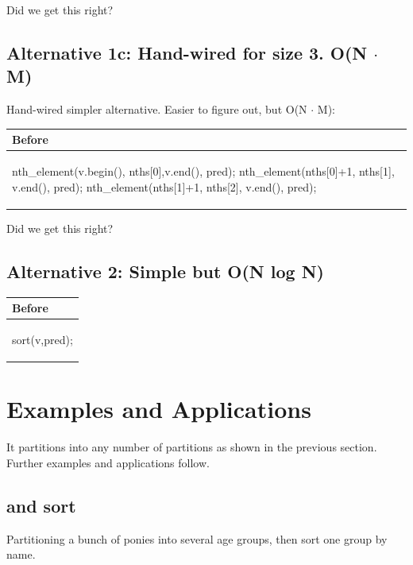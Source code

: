 Did we get this right?

\subsection*{Alternative 1c: Hand-wired for size 3. O(N $\cdot$ M)}

Hand-wired simpler alternative. Easier to figure out, but O(N $\cdot$ M):

\hspace{3ex}\begin{tabular}{|l|} 
  \hline 
  \textbf{Before} \\
  \hline 
\begin{codeblock} 
nth_element(v.begin(), nths[0],v.end(), pred);
nth_element(nths[0]+1, nths[1], v.end(), pred);
nth_element(nths[1]+1, nths[2], v.end(), pred);
\end{codeblock} 
\\
\hline 
\end{tabular} 

Did we get this right?

\subsection*{Alternative 2: Simple but O(N log N)}

\hspace{3ex}\begin{tabular}{|l|} 
  \hline 
  \textbf{Before} \\
  \hline 
\begin{codeblock} 
sort(v,pred);
\end{codeblock}
\\
\hline 
\end{tabular} 

\section{Examples and Applications}

It partitions into any number of partitions as shown in the previous section. Further examples and applications follow.

\subsection{ and sort}

Partitioning a bunch of ponies into several age groups, then sort one group by name.

